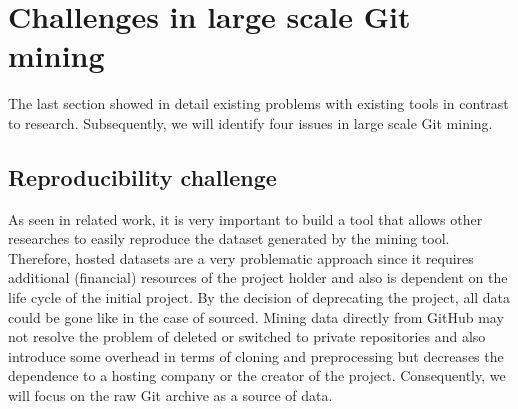 \documentclass[conference]{IEEEtran}
\begin{document}
\section{Challenges in large scale Git mining}
The last section showed in detail existing problems with existing tools in contrast to research. Subsequently, we will identify four issues in large scale Git mining.
\subsection{Reproducibility challenge}
As seen in related work, it is very important to build a tool that allows other researches to easily reproduce the dataset generated by the mining tool. Therefore, hosted datasets are a very problematic approach since it requires additional (financial) resources of the project holder and also is dependent on the life cycle of the initial project. By the decision of deprecating the project, all data could be gone like in the case of sourced. Mining data directly from GitHub may not resolve the problem of deleted or switched to private repositories and also introduce some overhead in terms of cloning and preprocessing but decreases the dependence to a hosting company or the creator of the project. Consequently, we will focus on the raw Git archive as a source of data.
\end{document}

